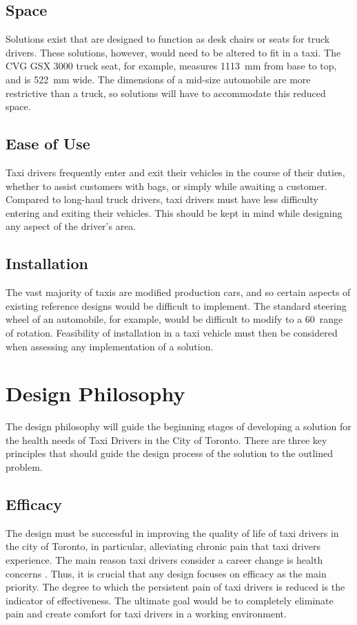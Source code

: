 \documentclass[11pt]{article}
\begin{document}

\subsection{Space}
\label{sec:space}

Solutions exist that are designed to function as desk chairs or seats for truck
drivers. These solutions, however, would need to be altered to fit in
a taxi. The CVG GSX 3000 truck seat, for example, measures 1113~mm from base
to top, and is 522~mm wide. The dimensions of a mid-size automobile
are more restrictive than a truck, so solutions will have to accommodate
this reduced space.

\subsection{Ease of Use}
\label{sec:ease}
Taxi drivers frequently enter and exit their vehicles in the course of
their duties, whether to assist customers with bags, or simply while awaiting
a customer. Compared to long-haul truck drivers, taxi drivers must have less
difficulty entering and exiting their vehicles. This should be kept in mind
while designing any aspect of the driver's area.
\subsection{Installation}
\label{sec:installation}

The vast majority of taxis are modified production cars, %
and so certain aspects of existing reference designs would be difficult to
implement. The standard steering wheel of an automobile, for example,
would be difficult to modify to a 60\textdegree~range of
rotation\cite{Ismail2003}. Feasibility of installation in a taxi vehicle must then
be considered when assessing any implementation of a solution.

\section{Design Philosophy}
\label{sec:philo}
The design philosophy will guide the beginning stages of developing a
solution for the health needs of Taxi Drivers in the City of
Toronto. There are three key principles that should
guide the design process of the solution to the outlined problem.
 
\subsection{Efficacy}
The design must be successful in improving the quality of life of taxi 
drivers in the city of Toronto, in particular, alleviating chronic pain 
that taxi drivers experience. The main reason taxi drivers consider a 
career change is health concerns \cite{chicago}. Thus, it is crucial that 
any design focuses on efficacy as the main priority. The degree to which 
the persistent pain of taxi drivers is reduced is the indicator of 
effectiveness. The ultimate goal would be to completely eliminate pain 
and create comfort for taxi drivers in a working environment. 
\end{document}
